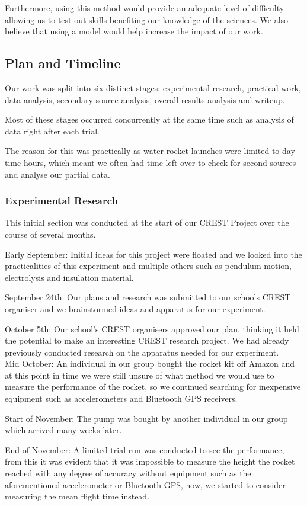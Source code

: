 \documentclass[14pt]{article}
\begin{document}
Furthermore, using this method would provide an adequate level of difficulty allowing us to test out skills benefiting our knowledge of the sciences. We also believe that using a model would help increase the impact of our work.

\subsection{Plan and Timeline}
Our work was split into six distinct stages: experimental research, practical work, data analysis, secondary source analysis, overall results analysis and writeup.

Most of these stages occurred concurrently at the same time such as analysis of data right after each trial. 

The reason for this was practically as water rocket launches were limited to day time hours, which meant we often had time left over to check for second sources and analyse our partial data.
\subsubsection{Experimental Research}
This initial section was conducted at the start of our CREST Project over the course of several months.

Early September: Initial ideas for this project were floated and we looked into the practicalities of this experiment and multiple others such as pendulum motion, electrolysis and insulation material.

September 24th: Our plans and research was submitted to our schools CREST organiser and we brainstormed ideas and apparatus for our experiment.

October 5th: Our school's CREST organisers approved our plan, thinking it held the potential to make an interesting CREST research project. We had already previously conducted research on the apparatus needed for our experiment.
\\
Mid October: An individual in our group bought the rocket kit off Amazon and  at this point in time we were still unsure of what method we would use to measure the performance of the rocket, so we continued searching for inexpensive equipment such as accelerometers and Bluetooth GPS receivers. 

Start of November: The pump was bought by another individual in our group which arrived many weeks later.

End of November: A limited trial run was conducted to see the performance, from this it was evident that it was impossible to measure the height the rocket reached with any degree of accuracy without equipment such as the aforementioned accelerometer or Bluetooth GPS, now, we started to consider measuring the mean flight time instead.\\
\end{document}
